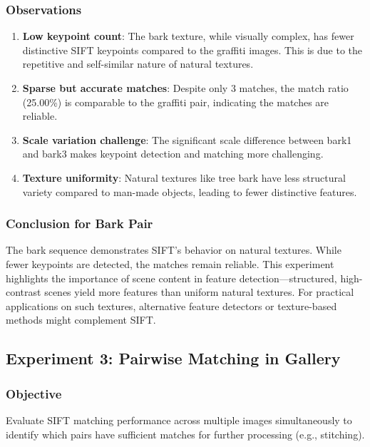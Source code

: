 \documentclass[12pt,a4paper]{article}
\begin{document}
\subsubsection{Observations}
\begin{enumerate}
    \item \textbf{Low keypoint count}: The bark texture, while visually complex, has fewer distinctive SIFT keypoints compared to the graffiti images. This is due to the repetitive and self-similar nature of natural textures.
    
    \item \textbf{Sparse but accurate matches}: Despite only 3 matches, the match ratio (25.00\%) is comparable to the graffiti pair, indicating the matches are reliable.
    
    \item \textbf{Scale variation challenge}: The significant scale difference between bark1 and bark3 makes keypoint detection and matching more challenging.
    
    \item \textbf{Texture uniformity}: Natural textures like tree bark have less structural variety compared to man-made objects, leading to fewer distinctive features.
\end{enumerate}

\subsubsection{Conclusion for Bark Pair}
The bark sequence demonstrates SIFT's behavior on natural textures. While fewer keypoints are detected, the matches remain reliable. This experiment highlights the importance of scene content in feature detection—structured, high-contrast scenes yield more features than uniform natural textures. For practical applications on such textures, alternative feature detectors or texture-based methods might complement SIFT.

\subsection{Experiment 3: Pairwise Matching in Gallery}

\subsubsection{Objective}
Evaluate SIFT matching performance across multiple images simultaneously to identify which pairs have sufficient matches for further processing (e.g., stitching).
\end{document}
